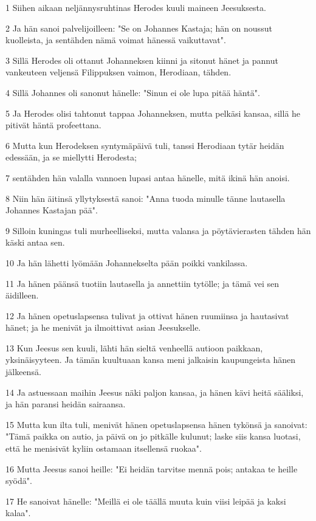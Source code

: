 \par 1 Siihen aikaan neljännysruhtinas Herodes kuuli maineen Jeesuksesta.
\par 2 Ja hän sanoi palvelijoilleen: "Se on Johannes Kastaja; hän on noussut kuolleista, ja sentähden nämä voimat hänessä vaikuttavat".
\par 3 Sillä Herodes oli ottanut Johanneksen kiinni ja sitonut hänet ja pannut vankeuteen veljensä Filippuksen vaimon, Herodiaan, tähden.
\par 4 Sillä Johannes oli sanonut hänelle: "Sinun ei ole lupa pitää häntä".
\par 5 Ja Herodes olisi tahtonut tappaa Johanneksen, mutta pelkäsi kansaa, sillä he pitivät häntä profeettana.
\par 6 Mutta kun Herodeksen syntymäpäivä tuli, tanssi Herodiaan tytär heidän edessään, ja se miellytti Herodesta;
\par 7 sentähden hän valalla vannoen lupasi antaa hänelle, mitä ikinä hän anoisi.
\par 8 Niin hän äitinsä yllytyksestä sanoi: "Anna tuoda minulle tänne lautasella Johannes Kastajan pää".
\par 9 Silloin kuningas tuli murheelliseksi, mutta valansa ja pöytävierasten tähden hän käski antaa sen.
\par 10 Ja hän lähetti lyömään Johannekselta pään poikki vankilassa.
\par 11 Ja hänen päänsä tuotiin lautasella ja annettiin tytölle; ja tämä vei sen äidilleen.
\par 12 Ja hänen opetuslapsensa tulivat ja ottivat hänen ruumiinsa ja hautasivat hänet; ja he menivät ja ilmoittivat asian Jeesukselle.
\par 13 Kun Jeesus sen kuuli, lähti hän sieltä venheellä autioon paikkaan, yksinäisyyteen. Ja tämän kuultuaan kansa meni jalkaisin kaupungeista hänen jälkeensä.
\par 14 Ja astuessaan maihin Jeesus näki paljon kansaa, ja hänen kävi heitä sääliksi, ja hän paransi heidän sairaansa.
\par 15 Mutta kun ilta tuli, menivät hänen opetuslapsensa hänen tykönsä ja sanoivat: "Tämä paikka on autio, ja päivä on jo pitkälle kulunut; laske siis kansa luotasi, että he menisivät kyliin ostamaan itsellensä ruokaa".
\par 16 Mutta Jeesus sanoi heille: "Ei heidän tarvitse mennä pois; antakaa te heille syödä".
\par 17 He sanoivat hänelle: "Meillä ei ole täällä muuta kuin viisi leipää ja kaksi kalaa".
